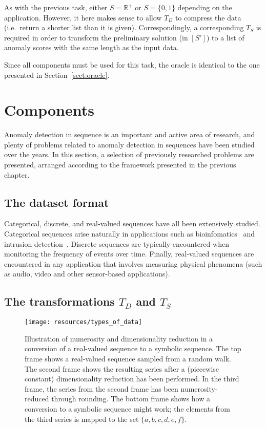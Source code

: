 As with the previous task, either $S = \mathbb{R}^+$ or $S = \{0, 1\}$ depending on the application. However, it here makes sense to allow $T_D$ to compress the data (i.e.\ return a shorter list than it is given). Correspondingly, a corresponding $T_S$ is required in order to transform the preliminary solution (in $[S']$) to a list of anomaly scores with the same length as the input data.

Since all components must be used for this task, the oracle is identical to the one presented in Section~\ref{sect:oracle}.

\section{Components}
\label{sect:prev_research}

Anomaly detection in sequence is an important and active area of research, and plenty of problems related to anomaly detection in sequences have been studied over the years. In this section, a selection of previously researched problems are presented, arranged according to the framework presented in the previous chapter.

\subsection{The dataset format}

Categorical, discrete, and real-valued sequences have all been extensively studied. Categorical sequences arise naturally in applications such as bioinfomatics~\cite{TODO} and intrusion detection~\cite{TODO}. Discrete sequences are typically encountered when monitoring the frequency of events over time. Finally, real-valued sequences are encountered in any application that involves measuring physical phenomena (such as audio, video and other sensor-based applications).

\subsection{The transformations $T_D$ and $T_S$}

\begin{figure}[htb]
  \begin{center}
    \leavevmode
    \texttt{[image: resources/types\_of\_data]}
  \end{center}
  \caption{\small{Illustration of numerosity and dimensionality reduction in a conversion of a real-valued sequence to a symbolic sequence. The top frame shows a real-valued sequence sampled from a random walk. The second frame shows the resulting series after a (piecewise constant) dimensionality reduction has been performed. In the third frame, the series from the second frame has been numerosity-reduced through rounding. The bottom frame shows how a conversion to a symbolic sequence might work; the elements from the third series is mapped to the set $\{a,b,c,d,e,f\}$.}}
\label{fig:types_of_data}
\end{figure}

